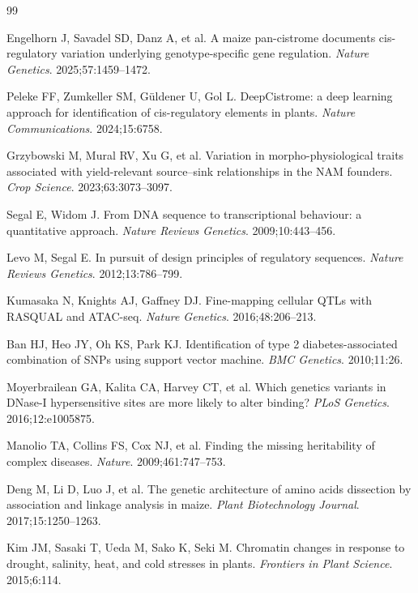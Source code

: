 \documentclass[10pt,letterpaper]{article}
\begin{document}
\begin{thebibliography}{99}

Engelhorn J, Savadel SD, Danz A, et al.
A maize pan-cistrome documents cis-regulatory variation underlying
genotype-specific gene regulation.
\textit{Nature Genetics}. 2025;57:1459--1472.

Peleke FF, Zumkeller SM, G\"uldener U, Gol L.
DeepCistrome: a deep learning approach for identification of cis-regulatory
elements in plants.
\textit{Nature Communications}. 2024;15:6758.

Grzybowski M, Mural RV, Xu G, et al.
Variation in morpho-physiological traits associated with yield-relevant
source--sink relationships in the NAM founders.
\textit{Crop Science}. 2023;63:3073--3097.

Segal E, Widom J.
From DNA sequence to transcriptional behaviour: a quantitative approach.
\textit{Nature Reviews Genetics}. 2009;10:443--456.

Levo M, Segal E.
In pursuit of design principles of regulatory sequences.
\textit{Nature Reviews Genetics}. 2012;13:786--799.

Kumasaka N, Knights AJ, Gaffney DJ.
Fine-mapping cellular QTLs with RASQUAL and ATAC-seq.
\textit{Nature Genetics}. 2016;48:206--213.

Ban HJ, Heo JY, Oh KS, Park KJ.
Identification of type 2 diabetes-associated combination of SNPs using
support vector machine.
\textit{BMC Genetics}. 2010;11:26.

Moyerbrailean GA, Kalita CA, Harvey CT, et al.
Which genetics variants in DNase-I hypersensitive sites are more likely to
alter binding?
\textit{PLoS Genetics}. 2016;12:e1005875.

Manolio TA, Collins FS, Cox NJ, et al.
Finding the missing heritability of complex diseases.
\textit{Nature}. 2009;461:747--753.

Deng M, Li D, Luo J, et al.
The genetic architecture of amino acids dissection by association and linkage
analysis in maize.
\textit{Plant Biotechnology Journal}. 2017;15:1250--1263.

Kim JM, Sasaki T, Ueda M, Sako K, Seki M.
Chromatin changes in response to drought, salinity, heat, and cold stresses
in plants.
\textit{Frontiers in Plant Science}. 2015;6:114.


\end{thebibliography}
\end{document}
